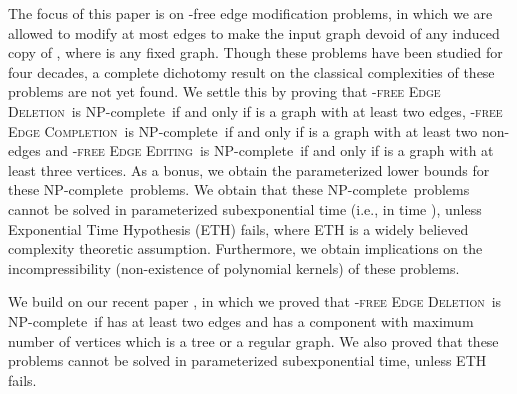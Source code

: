 \documentclass[envcountsame,envcountsect,10pt,oribibl]{llncs}
\newcommand{\pname}[1]{\textnormal{\textsc{#1}}}
\newcommand{\cclass}[1]{\textnormal{\textsf{#1}}}
\newcommand{\HED}{\pname{-free Edge Deletion}}
\newcommand{\HEC}{\pname{-free Edge Completion}}
\newcommand{\HEE}{\pname{-free Edge Editing}}
\newcommand{\NPC}{\cclass{NP-complete}}
\begin{document}
The focus of this paper is on -free edge modification problems,
in which we are allowed to modify at most  edges to make the input
graph devoid of any induced copy of , where  is any fixed graph.
Though these problems have been studied for four decades, a complete
dichotomy result on the classical complexities of these problems are not yet found.
We settle this by proving that \HED\ is \NPC\ if and only if  is a graph with at least two edges, 
\HEC\ is \NPC\ if and only if  is a graph with at least two non-edges and
 \HEE\ is \NPC\ if and only if  is a graph with at least three vertices.
As a bonus, we obtain the parameterized lower bounds for these \NPC\ problems.
We obtain that these \NPC\ problems cannot be solved in parameterized 
subexponential time (i.e., in time ), unless
Exponential Time Hypothesis (ETH) fails, where ETH is a widely believed complexity theoretic
assumption. Furthermore, we obtain implications on the incompressibility 
(non-existence of polynomial kernels) of these problems.

We build on our recent paper \cite{DBLP:conf/cocoa/AravindSS15},
in which we proved that \HED\ is \NPC\ if  has at least two edges and 
has a component with
maximum number of vertices which is a tree or a regular graph.
We also proved that these problems cannot be solved in parameterized 
subexponential time, unless ETH fails.
\end{document}
